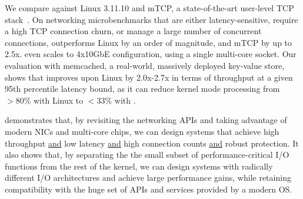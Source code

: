 



We compare \ix against Linux 3.11.10 and mTCP, a state-of-the-art
user-level TCP stack~\cite{jeong2014mtcp}.  On networking
microbenchmarks that are either latency-sensitive, require a high TCP
connection churn, or manage a large number of concurrent connections,
\ix outperforms Linux by an order of magnitude, and mTCP by up to
2.5x.  \ix even scales to 4x10GbE configuration, using a single
multi-core socket.  Our evaluation with memcached, a real-world,
massively deployed key-value store, shows that \ix improves upon Linux
by 2.0x-2.7x in terms of throughput at a given 95th percentile latency
bound, as it can reduce kernel mode processing from $>80\%$ with Linux
to $<33\%$ with \ix.

\ix demonstrates that, by revisiting the networking APIs and taking
advantage of modern NICs and multi-core chips, we can design systems
that achieve high throughput \underline{and} low latency
\underline{and} high connection counts \underline{and} robust
protection. It also shows that, by separating the the small subset of
performance-critical I/O functions from the rest of the kernel, we can
design systems with radically different I/O architectures and achieve
large performance gains, while retaining compatibility with the huge
set of APIs and services provided by a modern OS.


